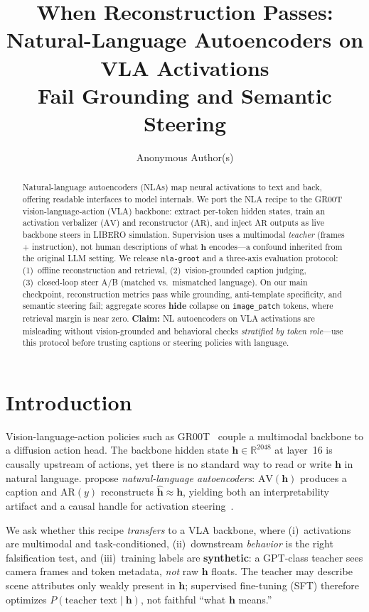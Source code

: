 \documentclass[10pt]{article}
\title{When Reconstruction Passes:\\
  Natural-Language Autoencoders on VLA Activations\\
  Fail Grounding and Semantic Steering}
\author{Anonymous Author(s)}
\date{}
\newcommand{\AV}{\ensuremath{\mathrm{AV}}}
\newcommand{\AR}{\ensuremath{\mathrm{AR}}}
\newcommand{\hvec}{\mathbf{h}}
\newcommand{\hhat}{\hat{\mathbf{h}}}
\newcommand{\code}[1]{\texttt{\small #1}}
\begin{document}
\maketitle

\begin{abstract}
Natural-language autoencoders (NLAs) map neural activations to text and back,
offering readable interfaces to model internals.
We port the NLA recipe to the GR00T vision-language-action (VLA) backbone:
extract per-token hidden states, train an activation verbalizer (\AV) and
reconstructor (\AR), and inject \AR{} outputs as live backbone steers in
LIBERO simulation.
Supervision uses a multimodal \emph{teacher} (frames + instruction), not
human descriptions of what \(\hvec\) encodes---a confound inherited from the
original LLM setting.
We release \code{nla-groot} and a three-axis evaluation protocol:
(1)~offline reconstruction and retrieval,
(2)~vision-grounded caption judging,
(3)~closed-loop steer A/B (matched vs.\ mismatched language).
On our main checkpoint, reconstruction metrics pass while grounding,
anti-template specificity, and semantic steering fail; aggregate scores
\textbf{hide} collapse on \code{image\_patch} tokens, where retrieval
margin is near zero.
\textbf{Claim:} NL autoencoders on VLA activations are misleading without
vision-grounded and behavioral checks \emph{stratified by token role}---use
this protocol before trusting captions or steering policies with language.
\end{abstract}

\section{Introduction}
\label{sec:intro}

Vision-language-action policies such as GR00T~\citep{nvidia2025gr00t} couple a
multimodal backbone to a diffusion action head.
The backbone hidden state \(\hvec \in \mathbb{R}^{2048}\) at layer~16 is
causally upstream of actions, yet there is no standard way to read or write
\(\hvec\) in natural language.
\citet{frasertaliente2026nla} propose \emph{natural-language autoencoders}:
\(\AV(\hvec)\) produces a caption and \(\AR(y)\) reconstructs
\(\hhat \approx \hvec\), yielding both an interpretability artifact and a
causal handle for activation steering~\citep{turner2023actadd,zou2023repe}.

We ask whether this recipe \emph{transfers} to a VLA backbone, where
(i)~activations are multimodal and task-conditioned,
(ii)~downstream \emph{behavior} is the right falsification test, and
(iii)~training labels are \textbf{synthetic}: a GPT-class teacher sees camera
frames and token metadata, \emph{not} raw \(\hvec\) floats.
The teacher may describe scene attributes only weakly present in \(\hvec\);
supervised fine-tuning (SFT) therefore optimizes
\(P(\text{teacher text} \mid \hvec)\), not faithful ``what \(\hvec\) means.''
\end{document}

